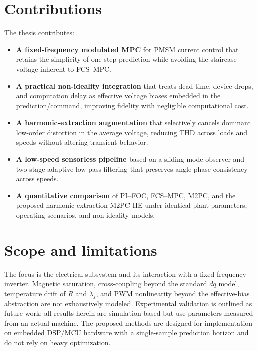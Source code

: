 \section{Contributions}
The thesis contributes:
\begin{itemize}
  \item \textbf{A fixed-frequency modulated MPC} for PMSM current control that retains the simplicity of one-step prediction while avoiding the staircase voltage inherent to FCS–MPC.
  \item \textbf{A practical non-ideality integration} that treats dead time, device drops, and computation delay as effective voltage biases embedded in the prediction/command, improving fidelity with negligible computational cost.
  \item \textbf{A harmonic-extraction augmentation} that selectively cancels dominant low-order distortion in the average voltage, reducing THD across loads and speeds without altering transient behavior.
  \item \textbf{A low-speed sensorless pipeline} based on a sliding-mode observer and two-stage adaptive low-pass filtering that preserves angle phase consistency across speeds.
  \item \textbf{A quantitative comparison} of PI–FOC, FCS–MPC, M2PC, and the proposed harmonic-extraction M2PC-HE under identical plant parameters, operating scenarios, and non-ideality models.
\end{itemize}

\section{Scope and limitations}
The focus is the electrical subsystem and its interaction with a fixed-frequency inverter. Magnetic saturation, cross-coupling beyond the standard $dq$ model, temperature drift of $R$ and $\lambda_{f}$, and PWM nonlinearity beyond the effective-bias abstraction are not exhaustively modeled. Experimental validation is outlined as future work; all results herein are simulation-based but use parameters measured from an actual machine. The proposed methods are designed for implementation on embedded DSP/MCU hardware with a single-sample prediction horizon and do not rely on heavy optimization.

